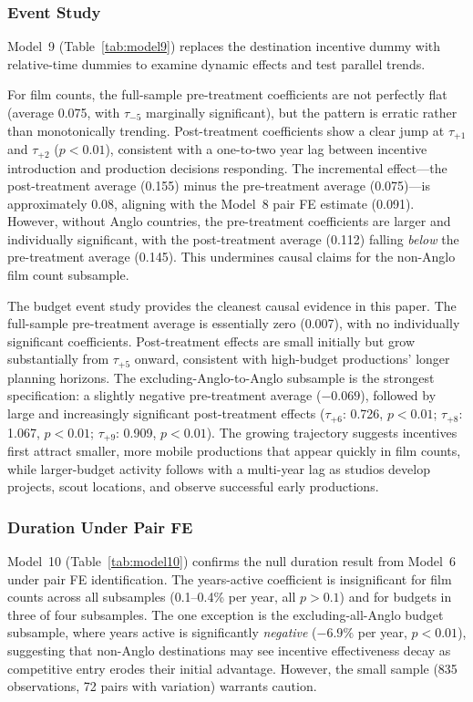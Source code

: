 \subsubsection{Event Study}

Model~9 (Table~\ref{tab:model9}) replaces the destination incentive dummy with relative-time dummies to examine dynamic effects and test parallel trends.

For film counts, the full-sample pre-treatment coefficients are not perfectly flat (average 0.075, with $\tau_{-5}$ marginally significant), but the pattern is erratic rather than monotonically trending. Post-treatment coefficients show a clear jump at $\tau_{+1}$ and $\tau_{+2}$ ($p < 0.01$), consistent with a one-to-two year lag between incentive introduction and production decisions responding. The incremental effect---the post-treatment average (0.155) minus the pre-treatment average (0.075)---is approximately 0.08, aligning with the Model~8 pair FE estimate (0.091). However, without Anglo countries, the pre-treatment coefficients are larger and individually significant, with the post-treatment average (0.112) falling \textit{below} the pre-treatment average (0.145). This undermines causal claims for the non-Anglo film count subsample.

The budget event study provides the cleanest causal evidence in this paper. The full-sample pre-treatment average is essentially zero (0.007), with no individually significant coefficients. Post-treatment effects are small initially but grow substantially from $\tau_{+5}$ onward, consistent with high-budget productions' longer planning horizons. The excluding-Anglo-to-Anglo subsample is the strongest specification: a slightly negative pre-treatment average ($-0.069$), followed by large and increasingly significant post-treatment effects ($\tau_{+6}$: 0.726, $p < 0.01$; $\tau_{+8}$: 1.067, $p < 0.01$; $\tau_{+9}$: 0.909, $p < 0.01$). The growing trajectory suggests incentives first attract smaller, more mobile productions that appear quickly in film counts, while larger-budget activity follows with a multi-year lag as studios develop projects, scout locations, and observe successful early productions.

\subsubsection{Duration Under Pair FE}

Model~10 (Table~\ref{tab:model10}) confirms the null duration result from Model~6 under pair FE identification. The years-active coefficient is insignificant for film counts across all subsamples (0.1--0.4\% per year, all $p > 0.1$) and for budgets in three of four subsamples. The one exception is the excluding-all-Anglo budget subsample, where years active is significantly \textit{negative} ($-6.9\%$ per year, $p < 0.01$), suggesting that non-Anglo destinations may see incentive effectiveness decay as competitive entry erodes their initial advantage. However, the small sample (835 observations, 72 pairs with variation) warrants caution.

